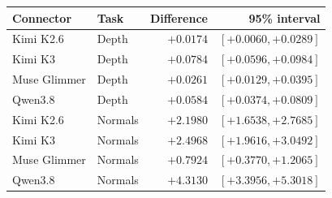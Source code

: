 \begin{tabular}{llrr}
\toprule
Connector & Task & Difference & 95\% interval\\
\midrule
Kimi K2.6 & Depth & $+0.0174$ & $[+0.0060, +0.0289]$\\
Kimi K3 & Depth & $+0.0784$ & $[+0.0596, +0.0984]$\\
Muse Glimmer & Depth & $+0.0261$ & $[+0.0129, +0.0395]$\\
Qwen3.8 & Depth & $+0.0584$ & $[+0.0374, +0.0809]$\\
Kimi K2.6 & Normals & $+2.1980$ & $[+1.6538, +2.7685]$\\
Kimi K3 & Normals & $+2.4968$ & $[+1.9616, +3.0492]$\\
Muse Glimmer & Normals & $+0.7924$ & $[+0.3770, +1.2065]$\\
Qwen3.8 & Normals & $+4.3130$ & $[+3.3956, +5.3018]$\\
\bottomrule
\end{tabular}

